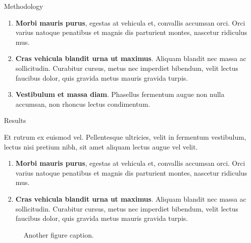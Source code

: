 \documentclass[final]{beamer}
\newlength{\colwidth}
\begin{document}
\begin{frame}[t]
\begin{columns}[t]
\begin{column}{\colwidth}
\begin{block}{Methodology}
				\begin{enumerate}
					\item \textbf{Morbi mauris purus}, egestas at vehicula et, convallis
					accumsan orci. Orci varius natoque penatibus et magnis dis parturient
					montes, nascetur ridiculus mus.
					\item \textbf{Cras vehicula blandit urna ut maximus}. Aliquam blandit nec
					massa ac sollicitudin. Curabitur cursus, metus nec imperdiet bibendum,
					velit lectus faucibus dolor, quis gravida metus mauris gravida turpis.
					\item \textbf{Vestibulum et massa diam}. Phasellus fermentum augue non
					nulla accumsan, non rhoncus lectus condimentum.
				\end{enumerate}
				
			\end{block}

				
			\begin{block}{Results}
				
				Et rutrum ex euismod vel. Pellentesque ultricies, velit in fermentum
				vestibulum, lectus nisi pretium nibh, sit amet aliquam lectus augue vel
				velit. 
				
				\begin{enumerate}
					\item \textbf{Morbi mauris purus}, egestas at vehicula et, convallis
					accumsan orci. Orci varius natoque penatibus et magnis dis parturient
					montes, nascetur ridiculus mus.
					\item \textbf{Cras vehicula blandit urna ut maximus}. Aliquam blandit nec
					massa ac sollicitudin. Curabitur cursus, metus nec imperdiet bibendum,
					velit lectus faucibus dolor, quis gravida metus mauris gravida turpis.
				\end{enumerate}
				
				\begin{figure}
					\centering
					\caption{Another figure caption.}
				\end{figure}
				

\end{block}
\end{column}
\end{columns}
\end{frame}
\end{document}
